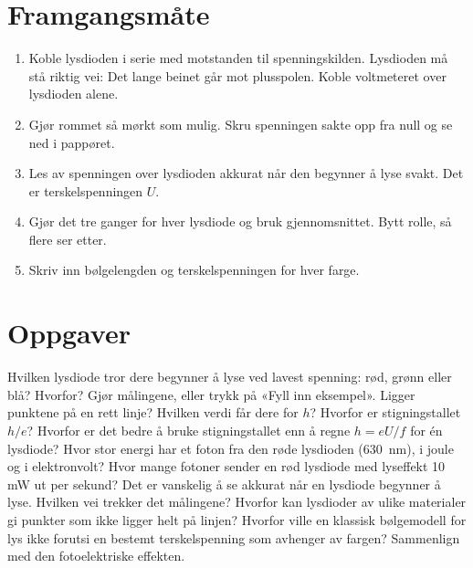\documentclass[11pt]{article}
\begin{document}
\section*{Framgangsmåte}

\begin{enumerate}
\item Koble lysdioden i serie med motstanden til spenningskilden. Lysdioden må stå riktig vei: Det lange beinet går mot plusspolen. Koble voltmeteret over lysdioden alene.
\item Gjør rommet så mørkt som mulig. Skru spenningen sakte opp fra null og se ned i pappøret.
\item Les av spenningen over lysdioden akkurat når den begynner å lyse svakt. Det er terskelspenningen $U$.
\item Gjør det tre ganger for hver lysdiode og bruk gjennomsnittet. Bytt rolle, så flere ser etter.
\item Skriv inn bølgelengden og terskelspenningen for hver farge.
\end{enumerate}

\section*{Oppgaver}

\begin{oppgaveliste}
\oppgave {}Hvilken lysdiode tror dere begynner å lyse ved lavest spenning: rød, grønn eller blå? Hvorfor?
\svar
\oppgave {}Gjør målingene, eller trykk på «Fyll inn eksempel». Ligger punktene på en rett linje? Hvilken verdi får dere for $h$?
\svar
\oppgave {}Hvorfor er stigningstallet $h/e$? Hvorfor er det bedre å bruke stigningstallet enn å regne $h = eU/f$ for én lysdiode?
\svar
\oppgave {}Hvor stor energi har et foton fra den røde lysdioden (630~nm), i joule og i elektronvolt? Hvor mange fotoner sender en rød lysdiode med lyseffekt 10 mW ut per sekund?
\svar
\oppgave {}Det er vanskelig å se akkurat når en lysdiode begynner å lyse. Hvilken vei trekker det målingene? Hvorfor kan lysdioder av ulike materialer gi punkter som ikke ligger helt på linjen?
\svar
\oppgave {}Hvorfor ville en klassisk bølgemodell for lys ikke forutsi en bestemt terskelspenning som avhenger av fargen? Sammenlign med den fotoelektriske effekten.
\svar
\end{oppgaveliste}
\end{document}
